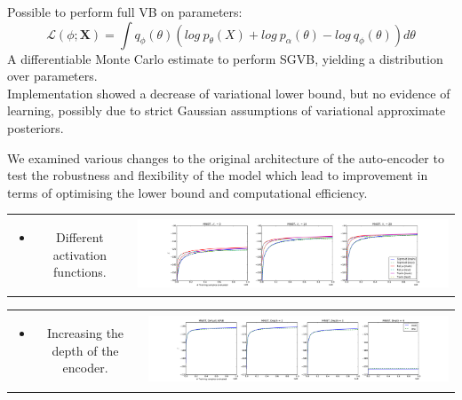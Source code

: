 \documentclass[landscape,a0b,final,a4resizeable]{include/a0poster}
\begin{document}
\begin{poster}
\begin{multicols}{3}
\newpage %


Possible to perform full VB on parameters:
$$\mathcal{L}(\phi; \mathbf{X}) = \int q_\phi(\theta)(log\ p_\theta(X) + log\ p_\alpha(\theta) - log\ q_\phi(\theta)) d\theta$$
A differentiable Monte Carlo estimate to perform SGVB, yielding a distribution over parameters.\\
Implementation showed a decrease of variational lower bound, but no evidence of learning, possibly due to strict Gaussian assumptions of variational approximate posteriors.

\vspace{0.25in}


We examined various changes to the original architecture of the auto-encoder to test the robustness and flexibility of the model which lead to improvement in terms of optimising the lower bound and computational efficiency.

\begin{tabular}{cc}
\begin{minipage}[c]{0.25\columnwidth}
\begin{itemize}
\item Different activation functions.
\end{itemize}
\end{minipage} & 
\begin{minipage}[c]{0.75\columnwidth}
\includegraphics[width=1.0\columnwidth, clip, trim=4mm 0mm 4mm 4mm]{../res/mnist_activations}
\end{minipage}
\end{tabular}

\vspace{0.5em}

\begin{tabular}{cc}
\begin{minipage}[c]{0.25\columnwidth}
\begin{itemize}
\item Increasing the depth of the encoder.
\end{itemize}
\end{minipage} & 
\begin{minipage}[c]{0.75\columnwidth}
\includegraphics[width=1.0\columnwidth, clip, trim=4mm 0mm 4mm 4mm]{../res/mnist_depth}
\end{minipage}
\end{tabular}


\end{multicols}
\end{poster}
\end{document}
